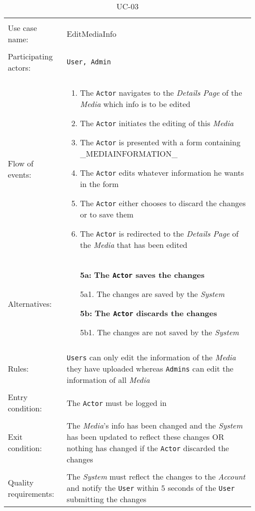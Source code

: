 \noindent
\begin{table}[h!]
\caption{UC-03}
\label{UC-03}
\begin{tabular}{ l  p{8cm} }  
\hline
\\
Use case name:  & EditMediaInfo   \\   \hline    
\\            
Participating actors:  & \texttt{\texttt{User}, \texttt{Admin}} \\   \hline   
\\             
Flow of events: & \begin{enumerate}
\item{The \texttt{Actor} navigates to the \textit{Details Page} of the \textit{Media} which info is to be edited}
\item{The \texttt{Actor} initiates the editing of this \textit{Media}}
\item{The \texttt{Actor} is presented with a form containing \_MEDIAINFORMATION\_}
\item{The \texttt{Actor} edits whatever information he wants in the form}
\item{The \texttt{Actor} either chooses to discard the changes or to save them}
\item{The \texttt{Actor} is redirected to the \textit{Details Page} of the \textit{Media} that has been edited}
\end{enumerate}
\\
Alternatives: & \begin{itemize}
\item[\textbf{5a:}]{\textbf{The \texttt{Actor} saves the changes}}
\item[]  5a1. The changes are saved by the \textit{System}
\item[\textbf{5b:}]{\textbf{The \texttt{Actor} discards the changes}}
\item[]  5b1. The changes are not saved by the \textit{System}
\end{itemize}
\\ \hline
\\
Rules: & \texttt{Users} can only edit the information of the \textit{Media} they have uploaded whereas \texttt{Admins} can edit the information of all \textit{Media}
\\   \hline 
\\
Entry condition: & The \texttt{Actor} must be logged in \\ \hline
\\
Exit condition: & The \textit{Media}'s info has been changed and the \textit{System} has been updated to reflect these changes OR
nothing has changed if the \texttt{Actor} discarded the changes \\ \hline
\\
Quality requirements: & The \textit{System} must reflect the changes to the \textit{Account} and notify the \texttt{User} within 5 seconds of the \texttt{User} submitting the changes \\ \hline  
\end{tabular}
\end{table}

